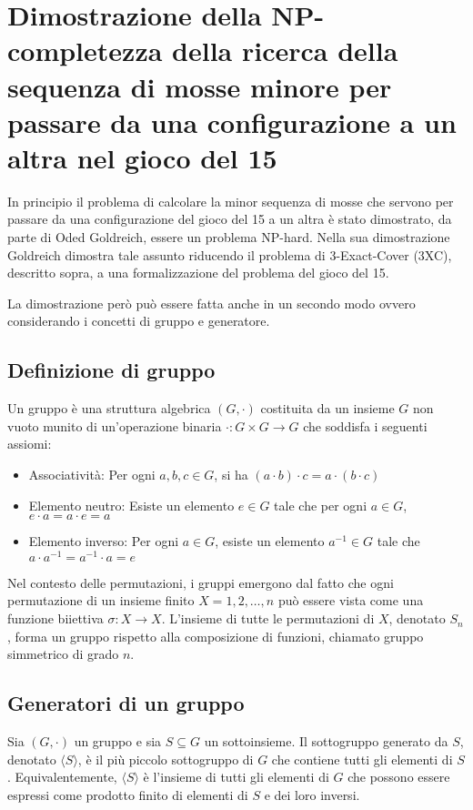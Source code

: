 \chapter{Dimostrazione della NP-completezza della ricerca della sequenza di mosse minore per passare da una configurazione a un altra nel gioco del 15}
 In principio il problema di calcolare la minor sequenza di mosse che servono per passare da una configurazione del gioco del 15 a un altra è stato dimostrato, da parte di Oded Goldreich, essere un problema NP-hard.
 Nella sua dimostrazione Goldreich dimostra tale assunto riducendo il problema di 3-Exact-Cover (3XC), descritto sopra, a una formalizzazione del problema del gioco del 15. ~\cite{2}

La dimostrazione però può essere fatta anche in un secondo modo ovvero considerando i concetti di gruppo e generatore.

\section{Definizione di gruppo}
Un gruppo è una struttura algebrica $(G, \cdot)$ costituita da un insieme $G$ non vuoto munito di un'operazione binaria $\cdot : G \times G \to G$ che soddisfa i seguenti assiomi:
\begin{itemize}
    \item Associatività: Per ogni $a, b, c \in G$, si ha $(a \cdot b) \cdot c = a \cdot (b \cdot c)$
    \item Elemento neutro: Esiste un elemento $e \in G$ tale che per ogni $a \in G$, $e \cdot a = a \cdot e = a$
    \item Elemento inverso: Per ogni $a \in G$, esiste un elemento $a^{-1} \in G$ tale che $a \cdot a^{-1} = a^{-1} \cdot a = e$
\end{itemize}

Nel contesto delle permutazioni, i gruppi emergono dal fatto che ogni permutazione di un insieme finito $X = {1, 2, \ldots, n}$ può essere vista come una funzione biiettiva $\sigma: X \to X$. L'insieme di tutte le permutazioni di $X$, denotato $S_n$, forma un gruppo rispetto alla composizione di funzioni, chiamato gruppo simmetrico di grado $n$.

\section{Generatori di un gruppo}
Sia $(G, \cdot)$ un gruppo e sia $S \subseteq G$ un sottoinsieme. Il sottogruppo generato da $S$, denotato $\langle S \rangle$, è il più piccolo sottogruppo di $G$ che contiene tutti gli elementi di $S$.
Equivalentemente, $\langle S \rangle$ è l'insieme di tutti gli elementi di $G$ che possono essere espressi come prodotto finito di elementi di $S$ e dei loro inversi.

